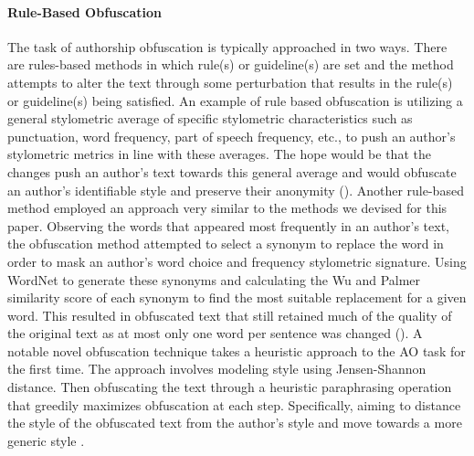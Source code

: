 \documentclass{article}
\begin{document}
\paragraph{Rule-Based Obfuscation}
The task of authorship obfuscation is typically approached in two ways. There are rules-based methods in which rule(s) or guideline(s) are set and the method attempts to alter the text through some perturbation that results in the rule(s) or guideline(s) being satisfied. An example of rule based obfuscation is utilizing a general stylometric average of specific stylometric characteristics such as punctuation, word frequency, part of speech frequency, etc., to push an author's stylometric metrics in line with these averages. The hope would be that the changes push an author's text towards this general average and would obfuscate an author's identifiable style and preserve their anonymity (\cite{Karadjov2017-el}). Another rule-based method employed an approach very similar to the methods we devised for this paper. Observing the words that appeared most frequently in an author's text, the obfuscation method attempted to select a synonym to replace the word in order to mask an author’s word choice and frequency stylometric signature. Using WordNet to generate these synonyms and calculating the Wu and Palmer similarity score of each synonym to find the most suitable replacement for a given word. This resulted in obfuscated text that still retained much of the quality of the original text as at most only one word per sentence was changed (\cite{Mansoorizadeh_undated-rf}).
A notable novel obfuscation technique takes a heuristic approach to the AO task for the first time. The approach involves modeling style using Jensen-Shannon distance. Then obfuscating the text through a heuristic paraphrasing operation that greedily maximizes obfuscation at each step. Specifically, aiming to distance the style of the obfuscated text from the author's style and move towards a more generic style \cite{bevendorff-etal-2019-heuristic}.
\end{document}
